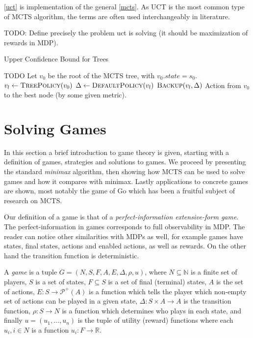 \autoref{uct} is implementation of the general \autoref{mcts}. As UCT is
the most common type of MCTS algorithm, the terms are often used
interchangeably in literature.

TODO: Define precisely the problem uct is solving (it should be
maximization of rewards in MDP).

\begin{algorithm}
    \caption{Upper Confidence Bound for Trees}
\label{uct}
\begin{algorithmic}
    \State TODO
    \State Let $v_0$ be the root of the MCTS tree, with $v_0.state = s_0$.
        \State $v_l \gets \Call{TreePolicy}{v_0}$
        \State $\Delta \gets \Call{DefaultPolicy}{v_l}$
        \State $\Call{Backup}{v_l, \Delta}$
    \EndWhile
    \State \Return Action from $v_0$ to the best node (by some
    given metric).
\EndFunction
\end{algorithmic}
\end{algorithm}

\section{Solving Games}

In this section a brief introduction to game theory is given, starting
with a definition of games, strategies and solutions to games. We
proceed by presenting the standard {\em minimax} algorithm, then showing
how MCTS can be used to solve games and how it compares with minimax.
Lastly applications to concrete games are shown, most notably the game
of Go which has been a fruitful subject of research on MCTS.

Our definition of a game is that of a {\em perfect-information
extensive-form game}. The perfect-information in games corresponds to
full observability in MDP.  The reader can notice other similarities
with MDPs as well, for example games have states, final states, actions
and enabled actions, as well as rewards. On the other hand the
transition function is deterministic.

\begin{definition}
    A {\em game} is a tuple $G = (N, S, F, A, E, \Delta, \rho, u)$,
    where $N \subseteq \mathbb{N}$ is a finite set of players,
    $S$ is a set of states,
    $F \subseteq S$ is a set of final (terminal) states,
    $A$ is the set of actions,
    $E : S \to \mathcal{P}^+(A)$ is a function which tells the player
    which non-empty set of actions can be played in a given state,
    $\Delta : S \times A \to A$ is the transition function,
    $\rho : S \to N$ is a function which determines who plays in each
    state, and finally $u = (u_1,\ldots,u_n)$ is the tuple of
    utility (reward) functions where each $u_i, i \in N$ is a function
    $u_i : F \to \mathbb{R}$.
\end{definition}

